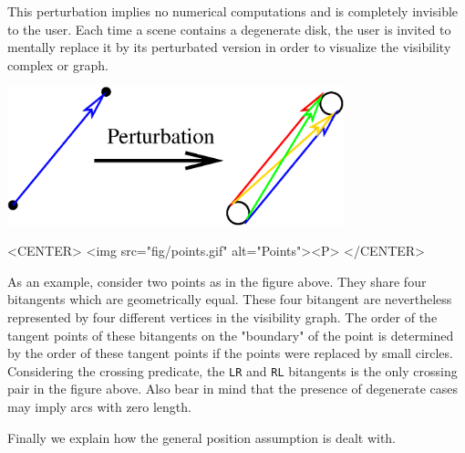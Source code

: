 This perturbation implies no numerical computations and is completely
invisible to the user. Each time a scene contains a degenerate disk, the user
is invited to mentally replace it by its perturbated version in order to
visualize the visibility complex or graph. 

\begin{ccTexOnly}
    \begin{center}
        \includegraphics[height=4cm]{fig/points.eps}%
    \end{center}
\end{ccTexOnly}

\begin{ccHtmlOnly}
    <CENTER>
        <img src="fig/points.gif" alt="Points"><P>
    </CENTER>
\end{ccHtmlOnly}

As an example, consider two points as in the figure above. They share four
bitangents which are geometrically equal. These four bitangent are nevertheless
represented by four different vertices in the visibility graph. The order of the
tangent points of these bitangents on the "boundary" of the point is determined
by the order of these tangent points if the points were replaced by small
circles. Considering the crossing predicate, the \texttt{LR} and \texttt{RL}
bitangents is the only crossing pair in the figure above.  Also bear in mind
that the presence of degenerate cases may imply arcs with zero length.

Finally we explain how the general position assumption is dealt with.

